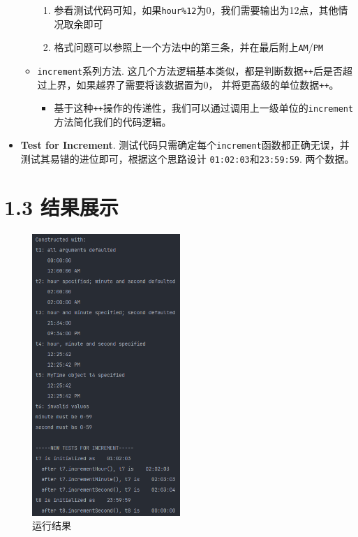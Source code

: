 \begin{itemize}
\begin{itemize}
        \begin{enumerate}
            \item 参看测试代码可知，如果\lstinline{hour%12}为0，我们需要输出为12点，其他情况取余即可
            \item 格式问题可以参照上一个方法中的第三条，并在最后附上\lstinline{AM}/\lstinline{PM}
        \end{enumerate}
        \item \lstinline{increment}系列方法. 这几个方法逻辑基本类似，都是判断数据\lstinline{++}后是否超过上界，如果越界了需要将该数据置为0，
        并将更高级的单位数据\lstinline{++}。
        \begin{itemize}
            \item 基于这种\lstinline{++}操作的传递性，我们可以通过调用上一级单位的\lstinline{increment}方法简化我们的代码逻辑。
        \end{itemize}
    \end{itemize}
    \item \textbf{Test for Increment}. 测试代码只需确定每个\lstinline{increment}函数都正确无误，并测试其易错的进位即可，根据这个思路设计
        \lstinline{01:02:03}和\lstinline{23:59:59}. 
    两个数据。
    
\end{itemize}

\section{1.3 结果展示}

\begin{figure}[H]
    \centering
    \includegraphics[width = 0.5\textwidth]{../pic/1/1.4.png}
    \caption{运行结果}
\end{figure}

